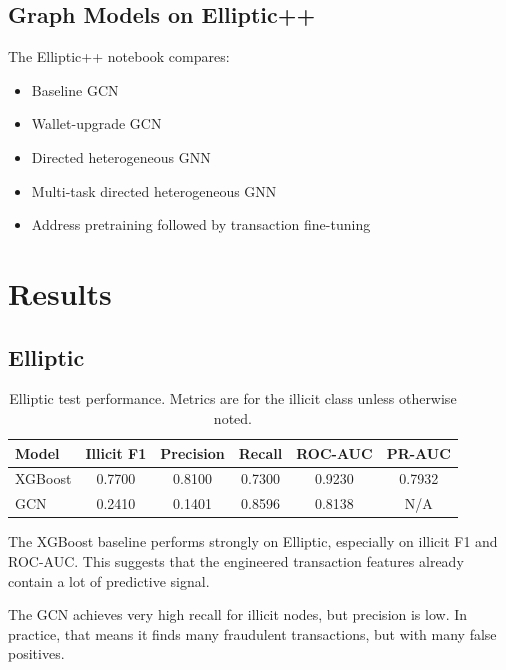 \documentclass[11pt,a4paper]{article}
\begin{document}
\subsection{Graph Models on Elliptic++}
The Elliptic++ notebook compares:
\begin{itemize}[noitemsep]
    \item Baseline GCN
    \item Wallet-upgrade GCN
    \item Directed heterogeneous GNN
    \item Multi-task directed heterogeneous GNN
    \item Address pretraining followed by transaction fine-tuning
\end{itemize}

\section{Results}

\subsection{Elliptic}
\begin{table}[htbp]
\centering
\begin{tabular}{lccccc}
\toprule
Model & Illicit F1 & Precision & Recall & ROC-AUC & PR-AUC \\
\midrule
XGBoost & 0.7700 & 0.8100 & 0.7300 & 0.9230 & 0.7932 \\
GCN & 0.2410 & 0.1401 & 0.8596 & 0.8138 & N/A \\
\bottomrule
\end{tabular}
\caption{Elliptic test performance. Metrics are for the illicit class unless otherwise noted.}
\label{tab:elliptic_results}
\end{table}

The XGBoost baseline performs strongly on Elliptic, especially on illicit F1 and ROC-AUC. This suggests that the engineered transaction features already contain a lot of predictive signal.

The GCN achieves very high recall for illicit nodes, but precision is low. In practice, that means it finds many fraudulent transactions, but with many false positives.
\end{document}
